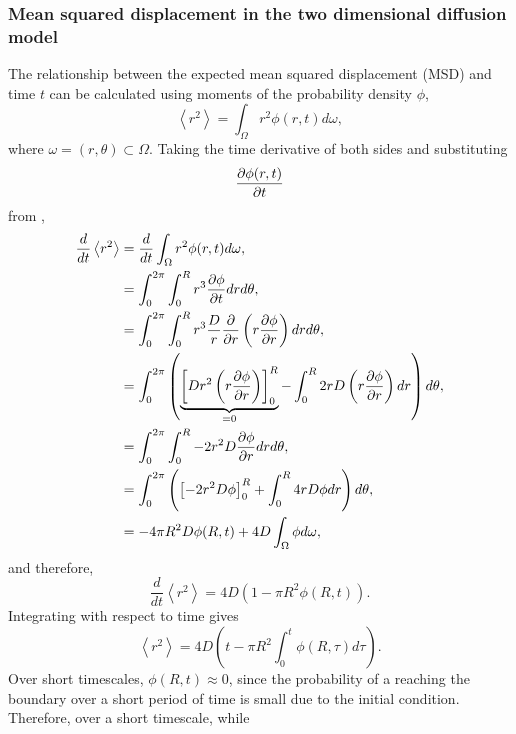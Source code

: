 \subsubsection{Mean squared displacement in the two dimensional diffusion model} \label{msd2d}
%
The relationship between the expected mean squared displacement (MSD) and time $t$
can be calculated using moments of the probability density $\phi$,
%
\begin{equation}
\left<r^2\right> = \int_{\Omega}r^2 \phi(r,t) d\omega ,
\label{eqn:MSD_expectation}
\end{equation}
%
where $\omega = (r,\theta) \subset \Omega$. Taking the time derivative of both
sides and substituting
\begin{equation}
    \frac{\partial \phi(r,t)}{\partial t}
\end{equation} from ,
%
\begin{align}
\frac{d}{dt} \left<r^2\right> &= \frac{d}{dt}\int_{\Omega}r^2 \phi(r,t) d\omega , \nonumber\\
                           &= \int_0^{2\pi} \int_0^{R} r^3 \frac{\partial \phi}{\partial t} dr d\theta ,\nonumber\\
                            &= \int_0^{2\pi} \int_0^{R} r^3 \frac{D}{r} \frac{\partial }{\partial r } \left( r \frac{\partial  \phi}{\partial  r}\right) dr d\theta , \nonumber\\
                            &= \int_0^{2\pi} \left( \underbrace{\left[ D r^2 \left( r \frac{\partial  \phi}{\partial  r}\right) \right]_0^{R}}_{=0} - \int_0^{R} 2rD \left(r \frac{\partial \phi}{\partial r} \right) dr \right) d\theta , \nonumber\\
                            &= \int_0^{2\pi} \int_0^{R} -2r^2D \frac{\partial  \phi}{\partial r}dr d\theta , \nonumber\\
                            &= \int_0^{2\pi} \left( \left[-2r^2D \phi \right]_0^{R} + \int_0^{R} 4rD \phi dr \right)d\theta , \nonumber\\
                            &= - 4\pi R^2D \phi(R,t) + 4D \int_{\Omega} \phi d\omega ,
\label{eqn:diffusion_1}
\end{align}
%
and therefore,
\begin{equation}
\frac{d}{dt} \left<r^2\right>  = 4D( 1- \pi R^2 \phi(R,t)) .
\end{equation}
%
Integrating with respect to time gives
%
\begin{equation}
\left<r^2\right> = 4D \left( t - \pi R^2 \int_0^t \phi(R,\tau) d \tau \right).
\label{eqn:diffusion_msd2d}
\end{equation}
%
Over short timescales, $\phi(R,t) \approx 0$, since the probability of a reaching the boundary over a short period of time is small due to the initial condition. Therefore, over a short timescale, while
